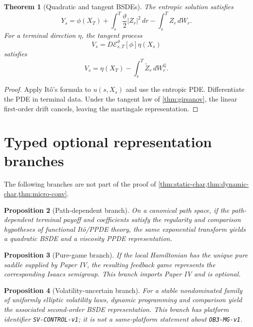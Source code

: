 \documentclass[11pt,reqno]{amsart}
\newtheorem{theorem}{Theorem}[section]
\newtheorem{proposition}[theorem]{Proposition}
\theoremstyle{definition}
\theoremstyle{remark}
\newcommand{\Qp}{\mathbb Q}
\newcommand{\cE}{\mathcal E}
\newcommand{\abs}[1]{\left\lvert #1\right\rvert}
\begin{document}
\begin{theorem}[Quadratic and tangent BSDEs]\label{thm:bsde}
The entropic solution satisfies
\[
 Y_s
 =
 \phi(X_T)
 +\int_s^T\frac{\vartheta}{2}\abs{Z_r}^2\,dr
 -\int_s^TZ_r\,dW_r.
\]
For a terminal direction $\eta$, the tangent process
\[
 V_s=D\cE_{s,T}^{\vartheta}[\phi]\eta(X_s)
\]
satisfies
\[
 V_s
 =
 \eta(X_T)
 -\int_s^T\widetilde Z_r\,dW_r^{\Qp}.
\]
\end{theorem}

\begin{proof}
Apply It\^o's formula to $u(s,X_s)$ and use the entropic PDE.  Differentiate
the PDE in terminal data.  Under the tangent law of
\cref{thm:girsanov}, the linear first-order drift cancels, leaving the
martingale representation.
\end{proof}

\section{Typed optional representation branches}\label{sec:branches}

The following branches are not part of the proof of
\cref{thm:static-char,thm:dynamic-char,thm:micro-conv}.

\begin{proposition}[Path-dependent branch]\label{prop:ppde}
On a canonical path space, if the path-dependent terminal payoff and
coefficients satisfy the regularity and comparison hypotheses of functional
It\^o/PPDE theory, the same exponential transform yields a quadratic BSDE and
a viscosity PPDE representation.
\end{proposition}

\begin{proposition}[Pure-game branch]\label{prop:game}
If the local Hamiltonian has the unique pure saddle supplied by Paper IV, the
resulting feedback game represents the corresponding Isaacs semigroup.  This
branch imports Paper IV and is optional.
\end{proposition}

\begin{proposition}[Volatility-uncertain branch]\label{prop:2bsde}
For a stable nondominated family of uniformly elliptic volatility laws,
dynamic programming and comparison yield the associated second-order BSDE
representation.  This branch has platform identifier
\texttt{SV-CONTROL-v1}; it is not a same-platform statement about
\texttt{OB3-MG-v1}.
\end{proposition}
\end{document}
